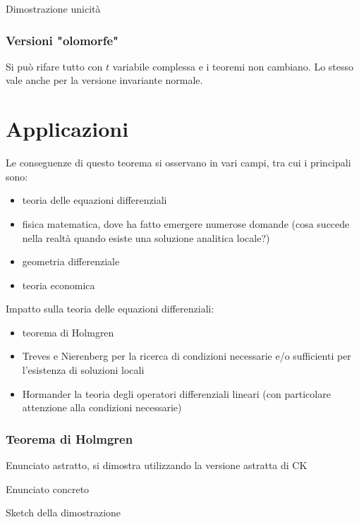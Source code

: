 \documentclass{beamer}
\begin{document}
\begin{frame}
Dimostrazione unicità
\end{frame}

\begin{frame}
\frametitle{Versioni "olomorfe"}
Si può rifare tutto con $t$ variabile complessa e i teoremi non cambiano. Lo stesso vale anche per la versione invariante normale.
\end{frame}




\section{Applicazioni}

\begin{frame}
Le conseguenze di questo teorema si osservano in vari campi, tra cui i principali sono:
\begin{itemize}
\item teoria delle equazioni differenziali
\item fisica matematica, dove ha fatto emergere numerose domande (cosa succede nella realtà quando esiste una soluzione analitica locale?)
\item geometria differenziale
\item teoria economica
\end{itemize}
\end{frame}

\begin{frame}
Impatto sulla teoria delle equazioni differenziali:
\begin{itemize}
\item teorema di Holmgren
\item Treves e Nierenberg per la ricerca di condizioni necessarie e/o sufficienti per l'esistenza di soluzioni locali
\item Hormander la teoria degli operatori differenziali lineari (con particolare attenzione alla condizioni necessarie)
\end{itemize}
\end{frame}

\begin{frame}
\frametitle{Teorema di Holmgren}
Enunciato astratto, si dimostra utilizzando la versione astratta di CK
\end{frame}


\begin{frame}
Enunciato concreto
\end{frame}

\begin{frame}
Sketch della dimostrazione
\end{frame}
\end{document}
